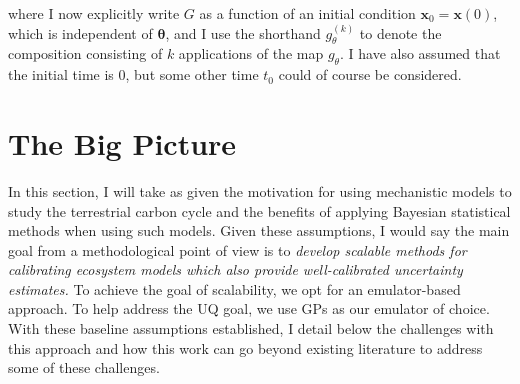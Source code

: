\documentclass[12pt]{article}
\newcommand{\btheta}{\boldsymbol{\theta}}
\newcommand{\bx}{\mathbf{x}}
\begin{document}
 where I now explicitly write $G$ as a function of an initial condition $\bx_0 = \bx(0)$, which is independent of $\btheta$, and I use the shorthand $g_\theta^{(k)}$ to denote 
 the composition consisting of $k$ applications of the map $g_\theta$. I have also assumed that the initial time is $0$, but 
 some other time $t_0$ could of course be considered. 

\section{The Big Picture}
In this section, I will take as given the motivation for using mechanistic models to study the terrestrial carbon cycle and the benefits of applying Bayesian statistical methods when using such models. 
Given these assumptions, I would say the main goal from a methodological point of view is to \textit{develop scalable methods for calibrating ecosystem models which also provide well-calibrated
uncertainty estimates.} To achieve the goal of scalability, we opt for an emulator-based approach. To help address the UQ goal, we use GPs as our emulator of choice. With these baseline assumptions 
established, I detail below the challenges with this approach and how this work can go beyond existing literature to address some of these challenges. 
\end{document}
